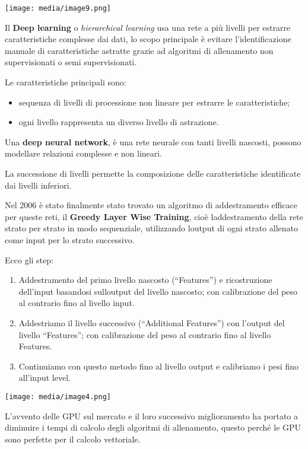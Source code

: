 \texttt{[image: media/image9.png]}

Il \textbf{Deep learning} o \emph{hierarchical learning} usa una rete a
più livelli per estrarre caratteristiche complesse dai dati, lo scopo
principale è evitare l'identificazione manuale di caratteristiche
astratte grazie ad algoritmi di allenamento non supervisionati o semi
supervisionati.

Le caratteristiche principali sono:

\begin{itemize}
\item
  sequenza di livelli di processione non lineare per estrarre le
  caratteristiche;
\item
  ogni livello rappresenta un diverso livello di astrazione.
\end{itemize}

Una \textbf{deep neural network}, è una rete neurale con tanti livelli
nascosti, possono modellare relazioni complesse e non lineari.

La successione di livelli permette la composizione delle caratteristiche
identificate dai livelli inferiori.

Nel 2006 è stato finalmente stato trovato un algoritmo di addestramento
efficace per queste reti, il \textbf{Greedy Layer Wise Training}, cioè
l\textquotesingle addestramento della rete strato per strato in modo
sequenziale, utilizzando l\textquotesingle output di ogni strato
allenato come input per lo strato successivo.

Ecco gli step:

\begin{enumerate}
\def\labelenumi{\arabic{enumi}.}
\item
  Addestramento del primo livello nascosto (``Features'') e
  ricostruzione dell'input basandosi sull\textquotesingle output del
  livello nascosto; con calibrazione del peso al contrario fino al
  livello input.
\item
  Addestriamo il livello successivo (``Additional Features'') con
  l'output del livello ``Features''; con calibrazione del peso al
  contrario fino al livello Features.
\item
  Continuiamo con questo metodo fino al livello output e calibriamo i
  pesi fino all'input level.
\end{enumerate}

\texttt{[image: media/image4.png]}

L'avvento delle GPU sul mercato e il loro successivo miglioramento ha
portato a diminuire i tempi di calcolo degli algoritmi di allenamento,
questo perché le GPU sono perfette per il calcolo vettoriale.
